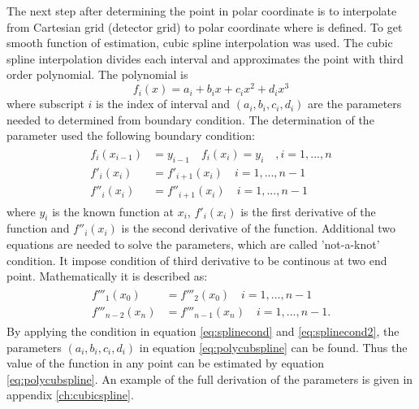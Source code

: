The next step after determining the point in polar coordinate is to interpolate from Cartesian grid (detector grid) to polar coordinate where \Blq is defined. To get smooth function of estimation, cubic spline interpolation was used. The cubic spline interpolation divides each interval and approximates the point with third order polynomial. The polynomial is
\begin{equation}
f_{i}(x)=a_i + b_i x + c_i x^2 + d_i x^3
\label{eq:polycubspline}
\end{equation}
where subscript $i$ is the index of interval and $(a_i, b_i ,c_i , d_i)$ are the parameters needed to determined from boundary condition. The determination of the parameter used the following boundary condition:
\begin{align}
\begin{split}
f_{i}(x_{i-1})&=y_{i-1} \quad f_{i}(x_{i})=y_i \quad ,i=1,...,n \\
f'_{i}(x_i)&=f'_{i+1}(x_i) \quad i=1,...,n-1 \\
f''_{i}(x_i)&=f''_{i+1}(x_i) \quad i=1,...,n-1 
\end{split}
\label{eq:splinecond}
\end{align}  
where $y_i$ is the known function at $x_i$,  $f'_{i}(x_i)$ is the first derivative of the function and $f''_{i}(x_i)$ is the second derivative of the function. Additional two equations are needed to solve the parameters, which are called 'not-a-knot' condition. It impose condition of third derivative to be continous at two end point. Mathematically it is described as:
\begin{align}
\begin{split}
f'''_{1}(x_0)&=f'''_{2}(x_0) \quad i=1,...,n-1  \\
f'''_{n-2}(x_n)&=f'''_{n-1}(x_n) \quad i=1,...,n-1.   
\end{split}
\label{eq:splinecond2}
\end{align}
By applying the condition in equation \ref{eq:splinecond} and \ref{eq:splinecond2}, the parameters $(a_i, b_i ,c_i , d_i)$ in equation \ref{eq:polycubspline} can be found. Thus the value of the function in any point can be estimated by equation \ref{eq:polycubspline}. An example of the full derivation of the parameters is given in appendix \ref{ch:cubicspline}.  

